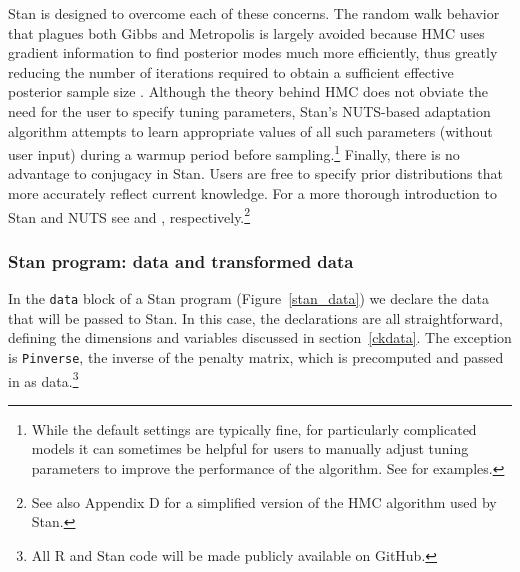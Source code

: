 Stan is designed to overcome each of these concerns. The random walk behavior that plagues both 
Gibbs and Metropolis is largely avoided because HMC uses gradient information to find posterior modes 
much more efficiently, thus greatly reducing the number of iterations required to obtain a sufficient 
effective posterior sample size . %
Although the theory behind HMC does 
not obviate the need for the user to specify tuning parameters, Stan's NUTS-based adaptation algorithm 
attempts to learn appropriate values of all such parameters (without user input) during a warmup 
period before sampling.\footnote{While the default settings are typically fine, for particularly complicated 
models it can sometimes be helpful for users to manually adjust tuning parameters to improve the 
performance of the algorithm. See  for examples.} 
Finally, there is no advantage to conjugacy in Stan. 
Users are free to specify prior distributions that more accurately reflect current knowledge. 
For a more thorough introduction to Stan and NUTS see  
and , respectively.\footnote{See also Appendix D %
for a simplified version of the HMC algorithm used by Stan.}

\subsubsection{Stan program: data and transformed data}

In the {\tt data} block of a Stan program (Figure~\ref{stan_data}) we declare the data that will 
be passed to Stan. In this case, the declarations are all straightforward, defining the dimensions 
and variables discussed in section~\ref{ckdata}. The exception is {\tt Pinverse}, the inverse of 
the penalty matrix, which is precomputed and passed in as data.\footnote{All R and Stan code 
will be made publicly available on GitHub.}

